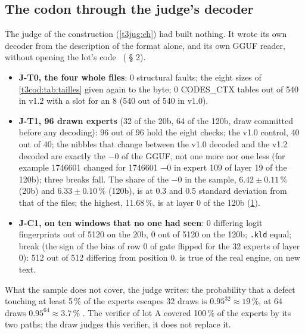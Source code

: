 \subsection{The codon through the judge's decoder}

The judge of the construction (\cref{t3jug:ch}) had built nothing. It wrote its own decoder from the description of the format alone, and its own GGUF reader, without opening the lot's code \mes~( § 2).

\begin{figure}[tbp]
\centering
\GrapheJconsCodon
{}
\label{fig:t3-jcons-codon}
\end{figure}

\begin{itemize}
\item \textbf{J-T0, the four whole files}: 0 structural faults; the eight sizes of \cref{t3cod:tab:tailles} given again to the byte; 0 CODES\_CTX tables out of 540 in v1.2 with a slot for an 8 (540 out of 540 in v1.0).
\item \textbf{J-T1, 96 drawn experts} (32 of the 20b, 64 of the 120b, draw committed before any decoding): 96 out of 96 hold the eight checks; the v1.0 control, 40 out of 40; the nibbles that change between the v1.0 decoded and the v1.2 decoded are exactly the $-0$ of the GGUF, not one more nor one less (for example \num{1746601} changed for \num{1746601} $-0$ in expert 109 of layer 19 of the 120b); three breaks fall. The share of the $-0$ in the sample, $6.42 \pm 0.11\,\%$ (20b) and $6.33 \pm 0.10\,\%$ (120b), is at 0.3 and 0.5 standard deviation from that of the files; the highest, 11.68\,\%, is at layer 0 of the 120b (\cref{fig:t3-jcons-codon}).
\item \textbf{J-C1, on ten windows that no one had seen}: 0 differing logit fingerprints out of \num{5120} on the 20b, 0 out of \num{5120} on the 120b; \texttt{.kld} equal; break (the sign of the bias of row 0 of gate flipped for the 32 experts of layer 0): 512 out of 512 differing from position 0.  is true of the real engine, on new text.
\end{itemize}

What the sample does not cover, the judge writes: the probability that a defect touching at least 5\,\% of the experts escapes 32 draws is $0.95^{32} \approx 19\,\%$, at 64 draws $0.95^{64} \approx 3.7\,\%$ \calc. The verifier of lot A covered 100\,\% of the experts by its two paths; the draw judges this verifier, it does not replace it.


